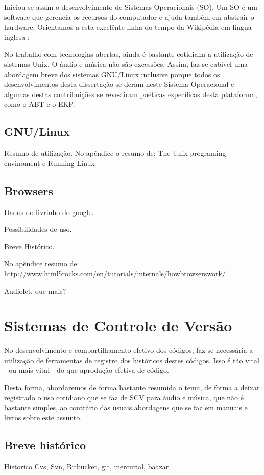 Iniciou-se assim o desenvolvimento de Sistemas Operacionais (SO).
Um SO é um software que gerencia os recursos do computador e ajuda
também em abstrair o hardware. Orientamos a esta excelênte linha do
tempo da Wikipédia em língua inglesa \cite{solinhadotempo}:

No trabalho com tecnologias abertas, ainda é bastante cotidiana
a utilização de sistemas Unix. O áudio e música não são excessões.
Assim, faz-se cabivel uma abordagem breve dos sistemas GNU/Linux
inclusive porque todos os desenvolvimentos desta dissertação se deram
neste Sistema Operacional e algumas destas contribuições se revestiram
poéticas específicas desta plataforma, como o ABT e o EKP.

\subsection{GNU/Linux}
Resumo de utilização. No apêndice o resumo de:
The Unix programing envinoment
e
Running Linux


\subsection{Browsers}

Dados do livrinho do google.

Possibilidades de uso.

Breve Histórico.

No apêndice resumo de:
http://www.html5rocks.com/en/tutorials/internals/howbrowserswork/

Audiolet, que mais?

\section{Sistemas de Controle de Versão}
No desenvolvimento e compartilhamento efetivo dos códigos, faz-se
necessária a utilização de ferramentas de registro dos históricos destes
códigos. Isso é tão vital - ou mais vital - do que aprodução efetiva de código.

Desta forma, abordaremos de forma bastante resumida o tema, de forma a deixar
registrado o uso cotidiano que se faz de SCV para áudio e música, que não
é bastante simples, ao contrário das usuais abordagens que se faz em manuais e livros
sobre este assunto.

\subsection{Breve histórico}
Historico Cvs, Svn, Bitbucket, git, mercurial, baazar

